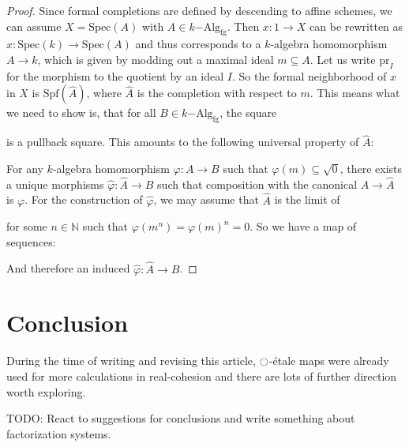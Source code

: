 \documentclass[9pt,twosided]{amsart}
\newcommand{\bN}{\mathbb N}
\newcommand{\Spec}{\ensuremath{\mathrm{Spec}}}
\newcommand{\Spf}{\ensuremath{\mathrm{Spf}}}
\newcommand{\fgkAlg}{\ensuremath{k\mathrm{-Alg}_{\mathrm{fg}}}}
\newcommand{\fgkAlgTop}{\ensuremath{k\mathrm{-Alg}_{\mathrm{fg,top}}}}
\newcommand{\todo}[1]{{\color{red}TODO: #1 \\}}
\begin{document}
\begin{proof}
  Since formal completions are defined by descending to affine schemes, we can assume $X=\Spec(A)$ with $A\in\fgkAlg$.
  Then $x:1\to X$ can be rewritten as $x:\Spec(k)\to\Spec(A)$ and thus corresponds to a $k$-algebra homomorphism $A\to k$,
  which is given by modding out a maximal ideal $m\subseteq A$. Let us write $\mathrm{pr}_I$ for the morphism to the quotient by an ideal $I$.
  So the formal neighborhood of $x$ in $X$ is $\Spf(\hat{A})$, where $\hat{A}$ is the completion with respect to $m$.
  This means what we need to show is, that for all $B\in\fgkAlg$, the square
  \begin{center}
  \end{center}
  is a pullback square. This amounts to the following universal property of $\hat{A}$:

  For any $k$-algebra homomorphism $\varphi:A\to B$ such that $\varphi(m)\subseteq \sqrt{0}$, there exists a unique morphisms
  $\hat{\varphi}:\hat{A}\to B$ such that composition with the canonical $A\to\hat{A}$ is $\varphi$.
  For the construction of $\hat{\varphi}$, we may assume that $\hat{A}$ is the limit of
  \begin{center}
  \end{center}
  for some $n\in\bN$ such that $\varphi(m^n)=\varphi(m)^n={0}$. So we have a map of sequences:
  \begin{center}
  \end{center}
  And therefore an induced $\hat{\varphi}:\hat{A}\to B$.
\end{proof}

\section{Conclusion}
During the time of writing and revising this article,
${\ocircle}$-étale maps were already used for more calculations in real-cohesion \cite{myers2019}
and there are lots of further direction worth exploring.

\todo{React to suggestions for conclusions and write something about factorization systems.}

\printbibliography
\end{document}
